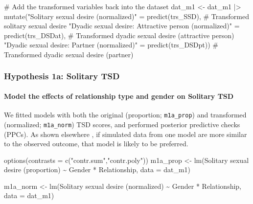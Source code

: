 \documentclass[
  bookmarksnumbered]{article}
\newenvironment{Shaded}{\begin{snugshade}}{\end{snugshade}}
\newcommand{\AttributeTok}[1]{\textcolor[rgb]{0.80,0.80,0.80}{#1}}
\newcommand{\CommentTok}[1]{\textcolor[rgb]{0.50,0.62,0.50}{#1}}
\newcommand{\FunctionTok}[1]{\textcolor[rgb]{0.94,0.94,0.56}{#1}}
\newcommand{\NormalTok}[1]{\textcolor[rgb]{0.80,0.80,0.80}{#1}}
\newcommand{\OtherTok}[1]{\textcolor[rgb]{0.94,0.94,0.56}{#1}}
\newcommand{\SpecialCharTok}[1]{\textcolor[rgb]{0.86,0.64,0.64}{#1}}
\newcommand{\StringTok}[1]{\textcolor[rgb]{0.80,0.58,0.58}{#1}}
\begin{document}
\begin{Shaded}
\begin{Highlighting}[]
\CommentTok{\# Add the transformed variables back into the dataset  }
\NormalTok{dat\_m1 }\OtherTok{\textless{}{-}}\NormalTok{ dat\_m1 }\SpecialCharTok{|\textgreater{}}  
  \FunctionTok{mutate}\NormalTok{(}\StringTok{"Solitary sexual desire (normalized)"} \OtherTok{=} 
           \FunctionTok{predict}\NormalTok{(trs\_SSD),  }\CommentTok{\# Transformed solitary sexual desire  }
         \StringTok{"Dyadic sexual desire: Attractive person (normalized)"} \OtherTok{=} 
           \FunctionTok{predict}\NormalTok{(trs\_DSDat),  }\CommentTok{\# Transformed dyadic sexual desire (attractive person)  }
         \StringTok{"Dyadic sexual desire: Partner (normalized)"} \OtherTok{=} 
           \FunctionTok{predict}\NormalTok{(trs\_DSDpt))  }\CommentTok{\# Transformed dyadic sexual desire (partner)  }
\end{Highlighting}
\end{Shaded}

\subsubsection{Hypothesis 1a: Solitary TSD}\label{hypothesis1a}

\paragraph{Model the effects of relationship type and gender on Solitary TSD}\label{model-the-effects-of-relationship-type-and-gender-on-solitary-tsd}

We fitted models with both the original (proportion; \texttt{m1a\_prop}) and transformed (normalized; \texttt{m1a\_norm}) TSD scores, and performed posterior predictive checks (PPCs). As shown elsewhere \autocite[e.g.,][]{gabryVisualizationBayesianWorkflow2019}, if simulated data from one model are more similar to the observed outcome, that model is likely to be preferred.

\begin{Shaded}
\begin{Highlighting}[]
\FunctionTok{options}\NormalTok{(}\AttributeTok{contrasts =} \FunctionTok{c}\NormalTok{(}\StringTok{"contr.sum"}\NormalTok{,}\StringTok{"contr.poly"}\NormalTok{))}
\NormalTok{m1a\_prop }\OtherTok{\textless{}{-}} \FunctionTok{lm}\NormalTok{(}\StringTok{\textasciigrave{}}\AttributeTok{Solitary sexual desire (proportion)}\StringTok{\textasciigrave{}} \SpecialCharTok{\textasciitilde{}}\NormalTok{ Gender }\SpecialCharTok{*}\NormalTok{ Relationship,}
            \AttributeTok{data =}\NormalTok{ dat\_m1)}

\NormalTok{m1a\_norm }\OtherTok{\textless{}{-}} \FunctionTok{lm}\NormalTok{(}\StringTok{\textasciigrave{}}\AttributeTok{Solitary sexual desire (normalized)}\StringTok{\textasciigrave{}} \SpecialCharTok{\textasciitilde{}}\NormalTok{ Gender }\SpecialCharTok{*}\NormalTok{ Relationship,}
           \AttributeTok{data =}\NormalTok{ dat\_m1)}
\end{Highlighting}
\end{Shaded}
\end{document}
